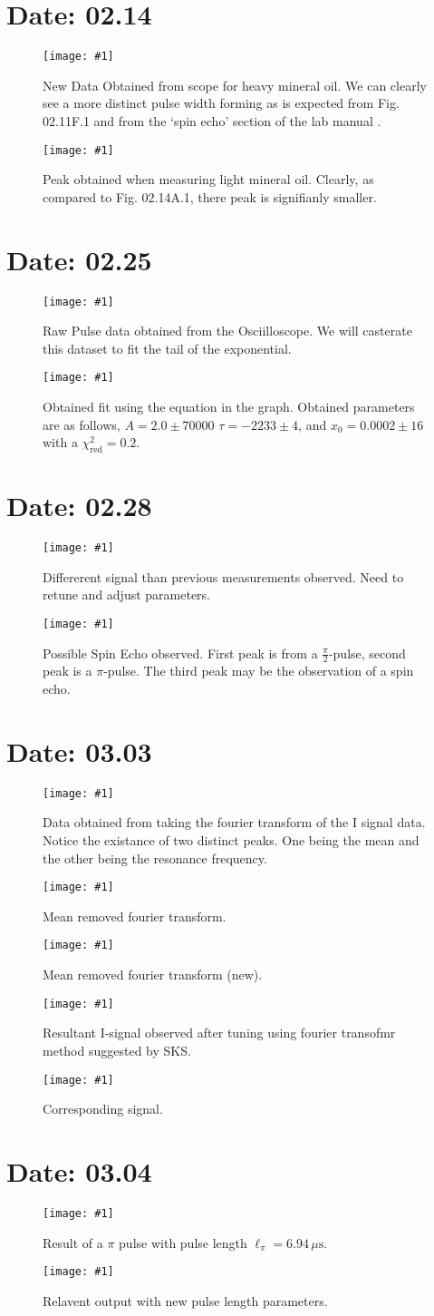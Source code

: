 \documentclass[reprint, amsmath,amssymb, amsthm, aip, cp]{revtex4-2}
\let\origthefigure\thefigure
\newcommand{\thedate}{00.00}
\newcommand{\figsml}{0.7\linewidth}
\newcommand{\newdate}[1]{\newpage\renewcommand{\thedate}{#1}\section*{Date: \thedate}}
\newcommand{\updatefig}[1]{\renewcommand{\thefigure}{\textbf{\thedate #1.\origthefigure}}\setcounter{figure}{0}}
\newcommand{\updatetab}[1]{\renewcommand{\thefigure}{\textbf{\thedate #1.\origthefigure}}\setcounter{table}{0}}
\newcommand{\mdfigure}[2]{
	\begin{mdframed}
	\begin{figure}[H]
		\centering
		\captionsetup{width=\figsml}
		\texttt{[image: \#1]}
		\caption{#2}
	\end{figure}
	\end{mdframed}
}
\begin{document}
\newdate{02.14}

\updatefig{A}
\mdfigure{../02.14/heavyminoil.png}{New Data Obtained from scope for heavy mineral oil. We can clearly see a more distinct pulse width forming as is expected from Fig. 02.11F.1 and from the `spin echo' section of the lab manual \cite{manual}.}


\updatefig{B}
\mdfigure{../02.14/lightminoil.png}{Peak obtained when measuring light mineral oil. Clearly, as compared to Fig. 02.14A.1, there peak is signifianly smaller.}



\newdate{02.25}
\mdfigure{../02.25/HMO1Raw.png}{Raw Pulse data obtained from the Osciilloscope. We will casterate this dataset to fit the tail of the exponential.}


\mdfigure{../02.25/HMO1Tail.png}{Obtained fit using the equation in the graph. Obtained parameters are as follows, $A = 2.0 \pm 70000$ $\tau = -2233 \pm 4$, and $x_0 = 0.0002 \pm 16$ with a $\chi^2_{\text{red}}=0.2$.}

\newdate{02.28}
\updatefig{A}
\mdfigure{../ucat/scope_41.png}{Differerent signal than previous measurements observed. Need to retune and adjust parameters.}

\updatefig{B}
\mdfigure{../ucat/scope_44.png}{Possible Spin Echo observed. First peak is from a $\frac{\pi}{2}$-pulse, second peak is a $\pi$-pulse. The third peak may be the observation of a spin echo.}

\newdate{03.03}
\updatefig{A}
\mdfigure{../ucat/fft.png}{Data obtained from taking the fourier transform of the I signal data. Notice the existance of two distinct peaks. One being the mean and the other being the resonance frequency.}

\mdfigure{../ucat/fft2.png}{Mean removed fourier transform.}

\mdfigure{../ucat/fft3.png}{Mean removed fourier transform (new).}

\updatefig{B}
\mdfigure{../ucat/49dif.png}{Resultant I-signal observed after tuning using fourier transofmr method suggested by SKS.}

\mdfigure{../ucat/49sig.png}{Corresponding signal.}

\newdate{03.04}
\updatefig{A}
\mdfigure{../ucat/scope_50.png}{Result of a $\pi$ pulse with pulse length $\ell_\pi = 6.94\,\mu\text{s}$.}

\updatefig{B}
\mdfigure{../ucat/scope_54.png}{Relavent output with new pulse length parameters.}
\end{document}
